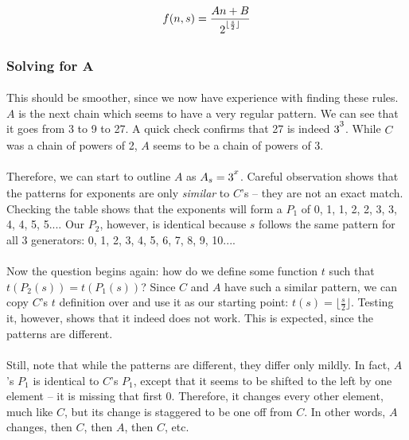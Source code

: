 \documentclass[12pt,letterpaper]{article}
\begin{document}
			\begin{equation*}
				f(n, s) = \frac{An + B}{2\strut^{\lfloor \frac{s}{2} \rfloor}}
			\end{equation*}
			
		\subsubsection{Solving for A}
		
			\paragraph{} This should be smoother, since we now have experience with finding these rules. $A$ is the next chain which seems to have a very regular pattern. We can see that it goes from 3 to 9 to 27. A quick check confirms that 27 is indeed $3\strut^3$. While $C$ was a chain of powers of 2, $A$ seems to be a chain of powers of 3.
			
			\paragraph{} Therefore, we can start to outline $A$ as $A_s = 3\strut^x$. Careful observation shows that the patterns for exponents are only \textit{similar} to $C$'s -- they are not an exact match. Checking the table shows that the exponents will form a $P_1$ of 0, 1, 1, 2, 2, 3, 3, 4, 4, 5, 5.... Our $P_2$, however, is identical because $s$ follows the same pattern for all 3 generators: 0, 1, 2, 3, 4, 5, 6, 7, 8, 9, 10....
			
			\paragraph{} Now the question begins again: how do we define some function $t$ such that $t(P_2(s)) = t(P_1(s))$? Since $C$ and $A$ have such a similar pattern, we can copy $C$'s $t$ definition over and use it as our starting point: $t(s) = \lfloor \frac{s}{2} \rfloor$. Testing it, however, shows that it indeed does not work. This is expected, since the patterns are different.
			
			\paragraph{} Still, note that while the patterns are different, they differ only mildly. In fact, $A$'s $P_1$ is identical to $C$'s $P_1$, except that it seems to be shifted to the left by one element -- it is missing that first 0. Therefore, it changes every other element, much like $C$, but its change is staggered to be one off from $C$. In other words, $A$ changes, then $C$, then $A$, then $C$, etc.
			
\end{document}

